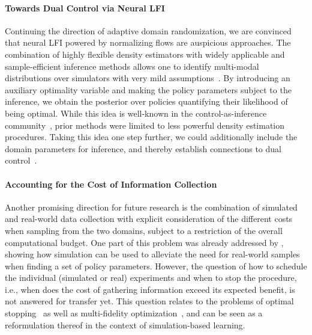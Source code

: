 \documentclass[utf8]{frontiersSCNS} %
\begin{document}
\paragraph*{Towards Dual Control via Neural \acl{LFI}}
Continuing the direction of adaptive domain randomization, we are convinced that neural \ac{LFI} powered by normalizing flows are auspicious approaches.
The combination of highly flexible density estimators with widely applicable and sample-efficient inference methods allows one to identify multi-modal distributions over simulators with very mild assumptions~\citep{Ramos_Fox_19,Barcelos_Ramos_21,Muratore_Peters_21_CoRL}.
By introducing an auxiliary optimality variable and making the policy parameters subject to the inference, we obtain the posterior over policies quantifying their likelihood of being optimal.
While this idea is well-known in the control-as-inference community~\citep{Rawlik_Vijayakumar_13,Levine_Koltun_13,Watson_Peters_21}, prior methods were limited to less powerful density estimation procedures.
Taking this idea one step further, we could additionally include the domain parameters for inference, and thereby establish connections to dual control~\citep{Feldbaum_60,Wittenmark_95}.

\paragraph*{Accounting for the Cost of Information Collection}
Another promising direction for future research is the combination of simulated and real-world data collection with explicit consideration of the different costs when sampling from the two domains, subject to a restriction of the overall computational budget.
One part of this problem was already addressed by \citet{Marco_Trimpe_17}, showing how simulation can be used to alleviate the need for real-world samples when finding a set of policy parameters.
However, the question of how to schedule the individual (simulated or real) experiments and when to stop the procedure, i.e., when does the cost of gathering information exceed its expected benefit, is not answered for \simtoreal transfer yet.
This question relates to the problems of optimal stopping~\citep{Chow_Robbins_63} as well as multi-fidelity optimization~\citep{Forrester_Keane_07}, and can be seen as a reformulation thereof in the context of simulation-based learning.

\end{document}
